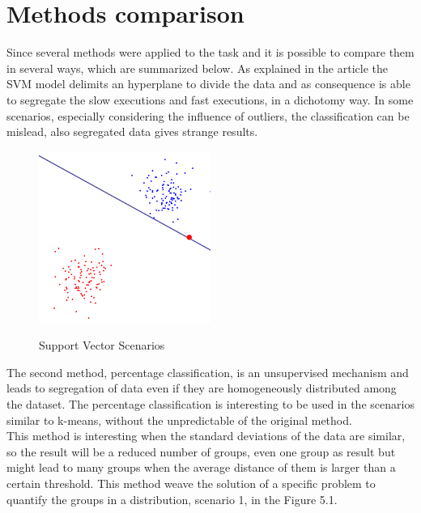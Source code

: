 \section{Methods comparison}
Since several methods were applied to the task and it is possible to compare them in several ways, which are summarized below.
As explained in the article the SVM model delimits an hyperplane to divide the data and as consequence is able to segregate the slow executions and fast executions, in a dichotomy way. In some scenarios, especially considering the influence of outliers, the classification can be mislead, also segregated data gives strange results.\\
 \begin{figure}[h]
          \center
          \caption{Support Vector Scenarios}
            \includegraphics[width=0.50\textwidth]{figures/svm.png}
            \label{fig:svm_scenarios}
 \end{figure}
The second method, percentage classification, is an unsupervised mechanism and leads to segregation of data even if they are homogeneously distributed among the dataset. The percentage classification is interesting to be used in the scenarios similar to k-means, without the unpredictable of the original method.\\
This method is interesting when the standard deviations of the data are similar, so the result will be a reduced number of groups, even one group as result but might lead to many groups when the average distance of them is larger than a certain threshold. This method weave the solution of a specific problem to quantify the groups in a distribution, scenario 1, in the Figure 5.1. 
 
